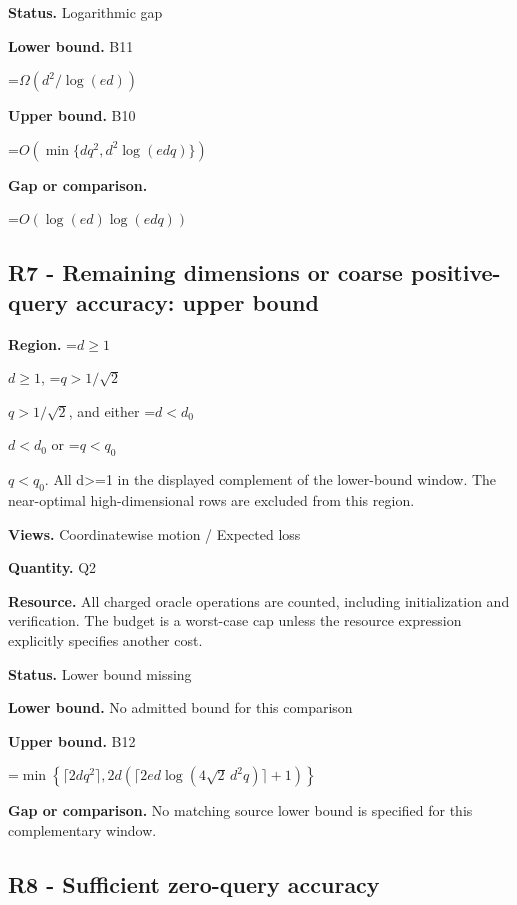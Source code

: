 \documentclass[10pt,a4paper]{article}
\newcommand{\AtlasMath}[1]{\par\begingroup\centering\setbox0=\hbox{$\displaystyle #1$}\ifdim\wd0>1.4\linewidth\typeout{ATLAS WIDE FORMULA: \the\wd0}\fi\ifdim\wd0>\linewidth\resizebox{\linewidth}{!}{\box0}\else\box0\fi\par\endgroup}
\newcommand{\AtlasInlineMath}[1]{\begingroup\setbox0=\hbox{$#1$}\ifdim\wd0>.4\linewidth\endgroup\AtlasMath{#1}\else\endgroup$#1$\fi}
\begin{document}
\textbf{Status.} Logarithmic gap



\textbf{Lower bound.} B11



\AtlasMath{\Omega(d^2/\log(ed))}


\textbf{Upper bound.} B10



\AtlasMath{O(\min\{dq^2,d^2\log(edq)\})}


\textbf{Gap or comparison.}



\AtlasMath{O(\log(ed)\log(edq))}


\subsection{R7 - Remaining dimensions or coarse positive-query accuracy: upper bound}


\textbf{Region.} \AtlasInlineMath{d\ge1}, \AtlasInlineMath{q>1/\sqrt2}, and either \AtlasInlineMath{d<d_0} or \AtlasInlineMath{q<q_0}. All d>=1 in the displayed complement of the lower-bound window. The near-optimal high-dimensional rows are excluded from this region.



\textbf{Views.} Coordinatewise motion / Expected loss



\textbf{Quantity.} Q2



\textbf{Resource.} All charged oracle operations are counted, including initialization and verification. The budget is a worst-case cap unless the resource expression explicitly specifies another cost.



\textbf{Status.} Lower bound missing



\textbf{Lower bound.} No admitted bound for this comparison



\textbf{Upper bound.} B12



\AtlasMath{\min\left\{\lceil2dq^2\rceil,2d\left(\lceil2ed\log(4\sqrt2\,d^2q)\rceil+1\right)\right\}}


\textbf{Gap or comparison.} No matching source lower bound is specified for this complementary window.



\subsection{R8 - Sufficient zero-query accuracy}
\end{document}

